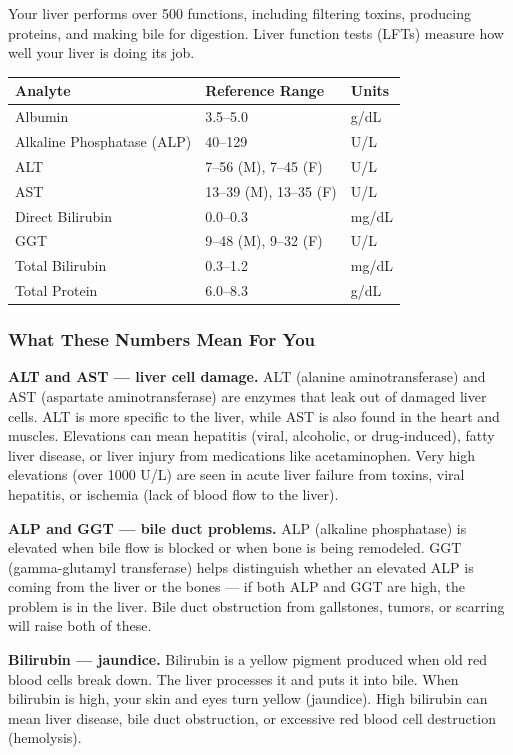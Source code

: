 Your liver performs over 500 functions, including filtering toxins, producing proteins, and making bile for digestion. Liver function tests (LFTs) measure how well your liver is doing its job.

\begin{longtable}{@{}lll@{}}
\toprule
\textbf{Analyte} & \textbf{Reference Range} & \textbf{Units} \\
\midrule
Albumin & 3.5--5.0 & g/dL \\
Alkaline Phosphatase (ALP) & 40--129 & U/L \\
ALT & 7--56 (M), 7--45 (F) & U/L \\
AST & 13--39 (M), 13--35 (F) & U/L \\
Direct Bilirubin & 0.0--0.3 & mg/dL \\
GGT & 9--48 (M), 9--32 (F) & U/L \\
Total Bilirubin & 0.3--1.2 & mg/dL \\
Total Protein & 6.0--8.3 & g/dL \\
\bottomrule
\end{longtable}

\subsubsection{What These Numbers Mean For You}

\textbf{ALT and AST --- liver cell damage.} ALT (alanine aminotransferase) and AST (aspartate aminotransferase) are enzymes that leak out of damaged liver cells. ALT is more specific to the liver, while AST is also found in the heart and muscles. Elevations can mean hepatitis (viral, alcoholic, or drug-induced), fatty liver disease, or liver injury from medications like acetaminophen. Very high elevations (over 1000 U/L) are seen in acute liver failure from toxins, viral hepatitis, or ischemia (lack of blood flow to the liver).

\textbf{ALP and GGT --- bile duct problems.} ALP (alkaline phosphatase) is elevated when bile flow is blocked or when bone is being remodeled. GGT (gamma-glutamyl transferase) helps distinguish whether an elevated ALP is coming from the liver or the bones --- if both ALP and GGT are high, the problem is in the liver. Bile duct obstruction from gallstones, tumors, or scarring will raise both of these.

\textbf{Bilirubin --- jaundice.} Bilirubin is a yellow pigment produced when old red blood cells break down. The liver processes it and puts it into bile. When bilirubin is high, your skin and eyes turn yellow (jaundice). High bilirubin can mean liver disease, bile duct obstruction, or excessive red blood cell destruction (hemolysis).

